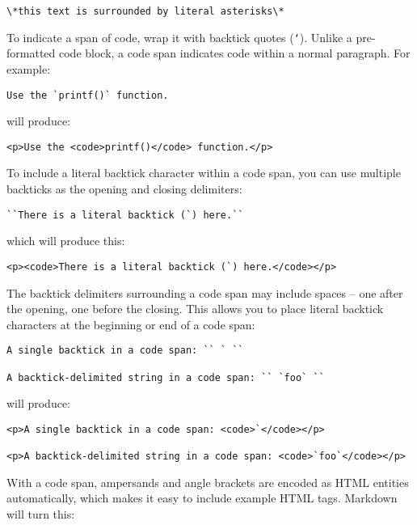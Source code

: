 \begin{verbatim}
\*this text is surrounded by literal asterisks\*
\end{verbatim}

To indicate a span of code, wrap it with backtick quotes (\texttt{`}).
Unlike a pre-formatted code block, a code span indicates code within a
normal paragraph. For example:

\begin{verbatim}
Use the `printf()` function.
\end{verbatim}

will produce:

\begin{verbatim}
<p>Use the <code>printf()</code> function.</p>
\end{verbatim}

To include a literal backtick character within a code span, you can use
multiple backticks as the opening and closing delimiters:

\begin{verbatim}
``There is a literal backtick (`) here.``
\end{verbatim}

which will produce this:

\begin{verbatim}
<p><code>There is a literal backtick (`) here.</code></p>
\end{verbatim}

The backtick delimiters surrounding a code span may include spaces --
one after the opening, one before the closing. This allows you to place
literal backtick characters at the beginning or end of a code span:

\begin{verbatim}
A single backtick in a code span: `` ` ``

A backtick-delimited string in a code span: `` `foo` ``
\end{verbatim}

will produce:

\begin{verbatim}
<p>A single backtick in a code span: <code>`</code></p>

<p>A backtick-delimited string in a code span: <code>`foo`</code></p>
\end{verbatim}

With a code span, ampersands and angle brackets are encoded as HTML
entities automatically, which makes it easy to include example HTML
tags. Markdown will turn this:

